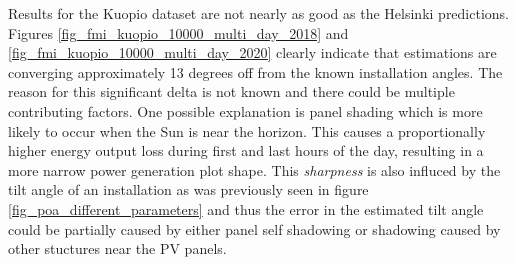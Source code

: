 \begin{figure}[!h]
\begin{floatrow}
\end{floatrow}
\end{figure}

\noindent Results for the Kuopio dataset are not nearly as good as the Helsinki predictions. Figures \ref{fig_fmi_kuopio_10000_multi_day_2018} and \ref{fig_fmi_kuopio_10000_multi_day_2020} clearly indicate that estimations are converging approximately 13 degrees off from the known installation angles. The reason for this significant delta is not known and there could be multiple contributing factors. One possible explanation is panel shading which is more likely to occur when the Sun is near the horizon. This causes a proportionally higher energy output loss during first and last hours of the day, resulting in a more narrow power generation plot shape. This \textit{sharpness} is also influced by the tilt angle of an installation as was previously seen in figure \ref{fig_poa_different_parameters} and thus the error in the estimated tilt angle could be partially caused by either panel self shadowing or shadowing caused by other stuctures near the PV panels.



